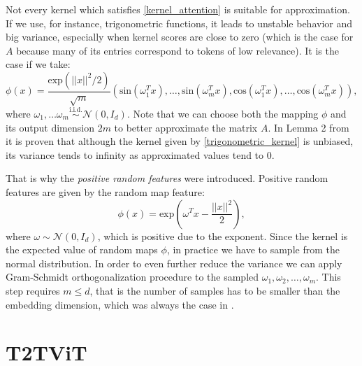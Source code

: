 \documentclass[magisterska,en]{pracamgr}
\begin{document}
Not every kernel which satisfies \ref{kernel_attention} is suitable for approximation. If we use, for instance, trigonometric functions, it leads to unstable behavior and big variance, especially when kernel scores are close to zero (which is the case for $A$ because many of its entries correspond to tokens of low relevance). It is the case if we take:
\begin{equation}
    \phi(x) = \frac{\textrm{exp}(||x||^2/2)}{\sqrt{m}}\left(\textrm{sin}(\omega _1^T x), \ldots, \textrm{sin}(\omega _m^T x), \textrm{cos}(\omega _1^T x), \ldots, \textrm{cos}(\omega _m^T x)\right),
\end{equation}\label{trigonometric_kernel}
where $\omega _1, \ldots \omega _m \stackrel{\textrm{i.i.d.}}{\sim} \mathcal{N}(0, I_d)$. Note that we can choose both the mapping $\phi$ and its output dimension $2m$ to better approximate the matrix $A$. In Lemma 2 from \cite{DBLP:conf/iclr/ChoromanskiLDSG21} it is proven that although the kernel given by \ref{trigonometric_kernel} is unbiased, its variance tends to infinity as approximated values tend to 0.


That is why the \textit{positive random features} were introduced. Positive random features are given by the random map feature:
\begin{equation*}
    \phi(x) = \textrm{exp}\left(\omega^T x-\frac{||x||^2}{2}\right),
\end{equation*}
where $\omega \sim \mathcal{N}(0, I_d)$, which is positive due to the exponent. Since the kernel is the expected value of random maps $\phi$, in practice we have to sample from the normal distribution. In order to even further reduce the variance we can apply Gram-Schmidt orthogonalization procedure to the sampled $\omega_1, \omega_2, \ldots, \omega_m$. This step requires $m\leq d$, that is the number of samples has to be smaller than the embedding dimension, which was always the case in \cite{DBLP:conf/iclr/ChoromanskiLDSG21}.

\section{T2T\textunderscore ViT}\label{s:T2T}
\end{document}
